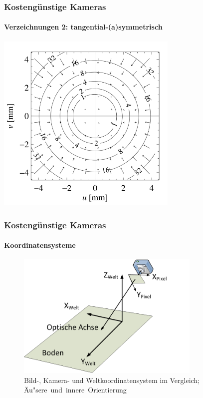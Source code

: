 \documentclass{beamer}
\begin{document}

\begin{frame}
	\frametitle{Kosteng\"unstige Kameras}\framesubtitle{Verzeichnungen 2: tangential-(a)symmetrisch}
	\centering
	\includegraphics[width=0.65\textwidth]{bilder/Verzeichnung2.png}\\
	\hskip110pt \footnotesize \color{gray}{(Author: Georg Wiora)}
\end{frame}


\begin{frame}[label=Kamerasystem2]
	\frametitle{Kosteng\"unstige Kameras}\framesubtitle{Koordinatensysteme}
	\begin{figure}
		\centering
		\includegraphics[height=60mm]{bilder/Kamerasystem2.png}
		\caption{Bild-, Kamera- und Weltkoordinatensystem im Vergleich;
		\"Au"sere~und~innere~Orientierung}
	\end{figure}
\end{frame}

\end{document}

